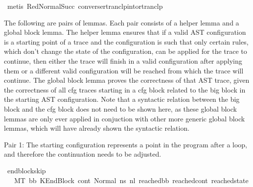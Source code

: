 \begin{isabellebody}
\ {\isacharparenleft}{\kern0pt}metis\ RedNormalSucc\ converse{\isacharunderscore}{\kern0pt}rtranclp{\isacharunderscore}{\kern0pt}into{\isacharunderscore}{\kern0pt}rtranclp{\isacharparenright}{\kern0pt}\isanewline
\ \ \isamarkupfalse%
\isanewline
{}\isamarkupfalse%
%
\endisatagproof
{\isafoldproof}%
%
\isadelimproof
%
\endisadelimproof
%
\isadelimdocument
%
\endisadelimdocument
%
\isatagdocument
%
\isamarkuptrue%
%
\endisatagdocument
{\isafolddocument}%
%
\isadelimdocument
%
\endisadelimdocument
%
\begin{isamarkuptext}%
The following are pairs of lemmas. Each pair consists of a helper lemma and a global block lemma. 
      The helper lemma ensures that if a valid AST configuration is a starting point of a trace and 
      the configuration is such that only certain rules, which don't change the state of the configuration, 
      can be applied for the trace to continue, then either the trace will finish in a valid configuration 
      after applying them or a different valid configuration will be reached from which the trace will continue.
      The global block lemma proves the correctness of that AST trace, given the correctness of all cfg traces 
      starting in a cfg block related to the big block in the starting AST configuration.
      Note that a syntactic relation between the big block and the cfg block does not need to be shown here, as these global block lemmas are only ever applied in conjuction with
      other more generic global block lemmas, which will have already shown the syntactic relation.%
\end{isamarkuptext}\isamarkuptrue%
%
\begin{isamarkuptext}%
Pair 1: The starting configuration represents a point in the program after a loop, and 
              therefore the continuation needs to be adjusted.%
\end{isamarkuptext}\isamarkuptrue%
\isamarkupfalse%
\ endblock{\isacharunderscore}{\kern0pt}skip{\isacharcolon}{\kern0pt}\isanewline
\ \ \ {\isachardoublequoteopen}M{\isacharcomma}{\kern0pt}{\isasymLambda}{\isacharcomma}{\kern0pt}{\isasymGamma}{\isacharcomma}{\kern0pt}{\isasymOmega}{\isacharcomma}{\kern0pt}T\ {\isasymturnstile}{\isacharparenleft}{\kern0pt}bb{}{\isacharcomma}{\kern0pt}\ KEndBlock\ cont{}{\isacharcomma}{\kern0pt}\ Normal\ ns{}{\isacharparenright}{\kern0pt}\ {\isacharminus}{\kern0pt}n{\isasymlongrightarrow}{\isacharcircum}{\kern0pt}l\ {\isacharparenleft}{\kern0pt}reached{\isacharunderscore}{\kern0pt}bb{\isacharcomma}{\kern0pt}\ reached{\isacharunderscore}{\kern0pt}cont{\isacharcomma}{\kern0pt}\ reached{\isacharunderscore}{\kern0pt}state{\isacharparenright}{\kern0pt}{\isachardoublequoteclose}\isanewline

\end{isabellebody}
